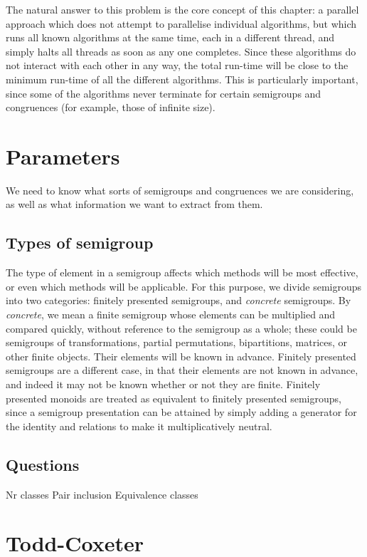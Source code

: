 The natural answer to this problem is the core concept of this chapter: a
parallel approach which does not attempt to parallelise individual algorithms,
but which runs all known algorithms at the same time, each in a different
thread, and simply halts all threads as soon as any one completes.  Since these
algorithms do not interact with each other in any way, the total run-time will
be close to the minimum run-time of all the different algorithms.  This is
particularly important, since some of the algorithms never terminate for certain
semigroups and congruences (for example, those of infinite size).

\section{Parameters}

We need to know what sorts of semigroups and congruences we are considering, as
well as what information we want to extract from them.

\subsection{Types of semigroup}

The type of element in a semigroup affects which methods will be most effective,
or even which methods will be applicable.  For this purpose, we divide
semigroups into two categories: finitely presented semigroups, and
\textit{concrete} semigroups.  By \textit{concrete}, we mean a finite semigroup
whose elements can be multiplied and compared quickly, without reference to the
semigroup as a whole; these could be semigroups of transformations, partial
permutations, bipartitions, matrices, or other finite objects.  Their elements
will be known in advance.  Finitely presented semigroups are a different case,
in that their elements are not known in advance, and indeed it may not be known
whether or not they are finite.  Finitely presented monoids are treated as
equivalent to finitely presented semigroups, since a semigroup presentation can
be attained by simply adding a generator for the identity and relations to make
it multiplicatively neutral.

\subsection{Questions}

Nr classes
Pair inclusion
Equivalence classes

\section{Todd-Coxeter}
\label{sec:tc}

